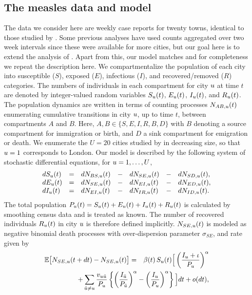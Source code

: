 \documentclass[12pt]{article}\usepackage[]{graphicx}\usepackage[]{xcolor}
\begin{document}
\subsection{The measles data and model}
\label{sec:model}

The data we consider here are weekly case reports for twenty towns, identical to those studied by \citet{he10}.
Some previous analyses have used counts aggregated over two week intervals \citep{park20,ionides21} since these were available for more cities, but our goal here is to extend the analysis of \citet{he10}.
Apart from this, our model matches \citet{ionides21} and for completeness we repeat the description here.
We compartmentalize the population of each city into susceptible ($S$), exposed ($E$), infectious ($I$), and recovered/removed ($R$) categories.
The numbers of individuals in each compartment for city $u$ at time $t$ are denoted by integer-valued random variables $S_u(t)$, $E_u(t)$, $I_u(t)$, and $R_u(t)$.
The population dynamics are written in terms of counting processes $N_{AB,u}(t)$ enumerating cumulative transitions in city $u$, up to time $t$, between compartments $A$ and $B$.
Here, $A,B\in \{S,E,I,R,B,D\}$ with $B$ denoting a source compartment for immigration or birth, and $D$ a sink compartment for emigration or death.
We enumerate the $U=20$ cities studied by \citet{he10} in decreasing size, so that $u=1$ corresponds to London.
Our model is described by the following system of stochastic differential equations, for $u=1,\dots, U$,
\begin{equation}
\nonumber
\begin{array}{lllllll}
\displaystyle dS_u(t) &=& dN_{BS,u}(t) &-& dN_{SE,u}(t) &-& dN_{SD,u}(t), \\
\displaystyle dE_u(t) &=& dN_{SE,u}(t) &-& dN_{EI,u}(t) &-& dN_{ED,u}(t), \\
\displaystyle dI_u(t) &=& dN_{EI,u}(t) &-& dN_{IR,u}(t) &-& dN_{ID,u}(t). 
\end{array}
\end{equation}
The total population $P_u(t)=S_u(t)+E_u(t)+I_u(t)+R_u(t)$ is calculated by smoothing census data and is treated as known.
The number of recovered individuals $R_u(t)$ in city $u$ is therefore defined implicitly.
$N_{SE,u}(t)$ is modeled as negative binomial death processes \citep{breto09,breto11}
with over-dispersion parameter $\sigma_{SE}$, and rate given by
\begin{eqnarray}
\nonumber
\mathbb{E} \big[ N_{SE,\unit}(t+dt) - N_{SE,\unit}(t) \big] 
&=& 
\beta(t) \, S_\unit(t) 
\Big[ 
  \left( \frac{I_\unit+\iota}{P_\unit} \right)^\alpha
\\
\label{eq:dEdt}
&& \hspace{-3.8cm}
 + \sum_{\altUnit \neq \unit} \frac{v_{\unit\altUnit}}{P_\unit} 
  \left\{ 
    \left(
      \frac{ I_{\altUnit} }{ P_{\altUnit} }
    \right)^\alpha - 
    \left(
      \frac{I_\unit}{P_\unit}  
    \right)^\alpha
  \right\}
\Big] dt + o(dt),\label{eqn:transmissionrate}
\end{eqnarray}
\end{document}
